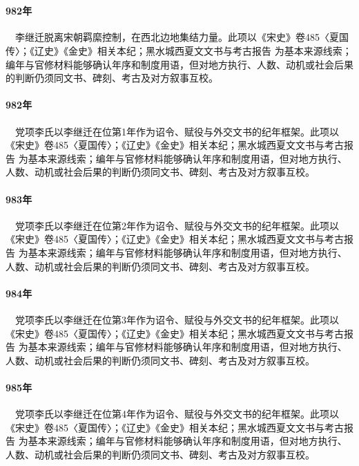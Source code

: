 \section{}

\paragraph{982年}　李继迁脱离宋朝羁縻控制，在西北边地集结力量。此项以《宋史》卷485〈夏国传〉；《辽史》《金史》相关本纪；黑水城西夏文文书与考古报告 为基本来源线索；编年与官修材料能够确认年序和制度用语，但对地方执行、人数、动机或社会后果的判断仍须同文书、碑刻、考古及对方叙事互校。

\paragraph{982年}　党项李氏以李继迁在位第1年作为诏令、赋役与外交文书的纪年框架。此项以《宋史》卷485〈夏国传〉；《辽史》《金史》相关本纪；黑水城西夏文文书与考古报告 为基本来源线索；编年与官修材料能够确认年序和制度用语，但对地方执行、人数、动机或社会后果的判断仍须同文书、碑刻、考古及对方叙事互校。

\paragraph{983年}　党项李氏以李继迁在位第2年作为诏令、赋役与外交文书的纪年框架。此项以《宋史》卷485〈夏国传〉；《辽史》《金史》相关本纪；黑水城西夏文文书与考古报告 为基本来源线索；编年与官修材料能够确认年序和制度用语，但对地方执行、人数、动机或社会后果的判断仍须同文书、碑刻、考古及对方叙事互校。

\paragraph{984年}　党项李氏以李继迁在位第3年作为诏令、赋役与外交文书的纪年框架。此项以《宋史》卷485〈夏国传〉；《辽史》《金史》相关本纪；黑水城西夏文文书与考古报告 为基本来源线索；编年与官修材料能够确认年序和制度用语，但对地方执行、人数、动机或社会后果的判断仍须同文书、碑刻、考古及对方叙事互校。

\paragraph{985年}　党项李氏以李继迁在位第4年作为诏令、赋役与外交文书的纪年框架。此项以《宋史》卷485〈夏国传〉；《辽史》《金史》相关本纪；黑水城西夏文文书与考古报告 为基本来源线索；编年与官修材料能够确认年序和制度用语，但对地方执行、人数、动机或社会后果的判断仍须同文书、碑刻、考古及对方叙事互校。


